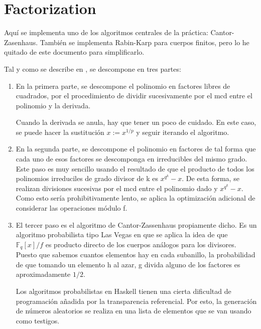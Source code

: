 \documentclass[12pt, a5paper]{article}
\theoremstyle{definition}
\begin{document}
\newpage\newpage

\section{Factorization}
Aquí se implementa uno de los algoritmos centrales de la práctica:
Cantor-Zasenhaus. También se implementa Rabin-Karp para cuerpos
finitos, pero lo he quitado de este documento para simplificarlo.

Tal y como se describe en \cite{compalg}, se descompone en tres
partes:

\begin{enumerate}
  \item En la primera parte, se descompone el polinomio en factores
    libres de cuadrados, por el procedimiento de dividir sucesivamente
    por el mcd entre el polinomio y la derivada.

    Cuando la derivada se anula, hay que tener un poco de cuidado. En
    este caso, se puede hacer la sustitución $x:=x^{1/p}$ y seguir
    iterando el algoritmo.

  \item En la segunda parte, se descompone el polinomio en factores de
    tal forma que cada uno de esos factores se descomponga en
    irreducibles del mismo grado. Este paso es muy sencillo usando el
    resultado de que el producto de todos los polinomios irreduciles
    de grado divisor de k es $x^{q^k}-x$. De esta forma, se realizan divisiones
    sucesivas por el mcd entre el polinomio dado y $x^{q^k}-x$. Como
    esto sería prohibitivamente lento, se aplica la optimización
    adicional de considerar las operaciones módulo f.

\newpage\newpage

  \item El tercer paso es el algoritmo de Cantor-Zassenhaus
    propiamente dicho. Es un algoritmo probabilista tipo Las Vegas en
    que se aplica la idea de que $\mathbb{F}_q[x]/f$ es producto
    directo de los cuerpos análogos para los divisores. Puesto que
    sabemos cuantos elementos hay en cada subanillo, la probabilidad
    de que tomando un elemento h al azar, g divida alguno de los factores
    es aproximadamente $1/2$.

    Los algoritmos probabilistas en Haskell tienen una cierta
    dificultad de programación añadida por la transparencia
    referencial. Por esto, la generación de números aleatorios se
    realiza en una lista de elementos que se van usando como testigos.


\newpage\newpage
\end{enumerate}
\end{document}
